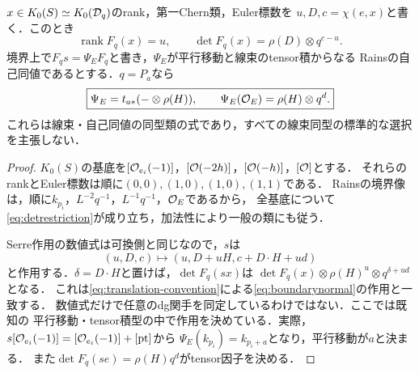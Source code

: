 \begin{proposition}[restrictionと反Serre境界作用]\label{prop:boundarynormal}
$x\in K_0(S)\simeq K_0(\mathcal D_q)$のrank，第一Chern類，Euler標数を
$u,D,c=\chi(e,x)$と書く．このとき
\begin{equation}\label{eq:detrestriction}
 \operatorname{rank}F_q(x)=u,\qquad
 \det F_q(x)=\rho(D)\otimes q^{c-u}.
\end{equation}
境界上で$F_qs=\Psi_EF_q$と書き，$\Psi_E$が平行移動と線束のtensor積からなる
Rainsの自己同値であるとする．$q=P_a$なら
\begin{equation}\label{eq:boundarynormal}
 \boxed{\Psi_E=t_{a*}(-\otimes\rho(H)),\qquad
 \Psi_E(\mathcal O_E)=\rho(H)\otimes q^d.}
\end{equation}
これらは線束・自己同値の同型類の式であり，すべての線束同型の標準的な選択を主張しない．
\end{proposition}
\begin{proof}
$K_0(S)$の基底を$[\mathcal O_{e_i}(-1)]$，$[\mathcal O(-2h)]$，$[\mathcal O(-h)]$，$[\mathcal O]$とする．
それらのrankとEuler標数は順に$(0,0),(1,0),(1,0),(1,1)$である．
Rainsの境界像は，順に$k_{p_i}$，$L^{-2}q^{-1}$，$L^{-1}q^{-1}$，$\mathcal O_E$であるから，
全基底について\eqref{eq:detrestriction}が成り立ち，加法性により一般の類にも従う．

Serre作用の数値式は可換側と同じなので，$s$は
\[
 (u,D,c)\longmapsto(u,D+uH,c+D\cdot H+ud)
\]
と作用する．$\delta=D\cdot H$と置けば，$\det F_q(sx)$は
$\det F_q(x)\otimes\rho(H)^u\otimes q^{\delta+ud}$となる．
これは\eqref{eq:translation-convention}による\eqref{eq:boundarynormal}の作用と一致する．
数値式だけで任意のdg関手を同定しているわけではない．ここでは既知の
平行移動・tensor積型の中で作用を決めている．実際，
$s[\mathcal O_{e_i}(-1)]=[\mathcal O_{e_i}(-1)]+[\mathrm{pt}]$から
$\Psi_E(k_{p_i})=k_{p_i+a}$となり，平行移動が$a$と決まる．
また$\det F_q(se)=\rho(H)q^d$がtensor因子を決める．
\end{proof}

